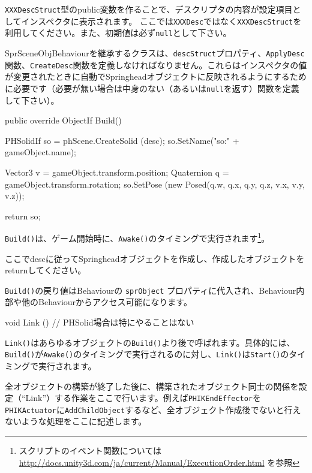 \texttt{XXXDescStruct}\KLUDGE 型のpublic\KLUDGE 変数を作ることで、デスクリプタの内容が設定項目としてインスペクタに表示されます。
\KLUDGE ここでは\texttt{XXXDesc}\KLUDGE ではなく\texttt{XXXDescStruct}\KLUDGE を利用してください。また、初期値は必ず\texttt{null}\KLUDGE として下さい。

SprSceneObjBehaviour\KLUDGE を継承するクラスは、\texttt{descStruct}\KLUDGE プロパティ、\texttt{ApplyDesc}\KLUDGE 関数、\texttt{CreateDesc}\KLUDGE 関数を定義しなければなりません。これらはインスペクタの値が変更されたときに自動でSpringhead\KLUDGE オブジェクトに反映されるようにするために必要です（必要が無い場合は中身のない（あるいは\texttt{null}\KLUDGE を返す）関数を定義して下さい）。

\begin{sourcecode}
    public override ObjectIf Build() {
        PHSolidIf so = phScene.CreateSolid (desc);
        so.SetName("so:" + gameObject.name);

        Vector3 v = gameObject.transform.position;
        Quaternion q = gameObject.transform.rotation;
        so.SetPose (new Posed(q.w, q.x, q.y, q.z, v.x, v.y, v.z));

        return so;
    }
\end{sourcecode}

\texttt{Build()}\KLUDGE は、ゲーム開始時に、\texttt{Awake()}\KLUDGE のタイミングで実行されます\footnote{\KLUDGE スクリプトのイベント関数については \url{http://docs.unity3d.com/ja/current/Manual/ExecutionOrder.html} \KLUDGE を参照}\KLUDGE 。

\KLUDGE ここでdesc\KLUDGE に従ってSpringhead\KLUDGE オブジェクトを作成し、作成したオブジェクトをreturn\KLUDGE してください。

\texttt{Build()}\KLUDGE の戻り値はBehaviour\KLUDGE の \texttt{sprObject} \KLUDGE プロパティに代入され、Behaviour\KLUDGE 内部や他のBehaviour\KLUDGE からアクセス可能になります。


\begin{sourcecode}
    void Link () {
        // PHSolid場合は特にやることはない
    }
\end{sourcecode}

\texttt{Link()}\KLUDGE はあらゆるオブジェクトの\texttt{Build()}\KLUDGE より後で呼ばれます。具体的には、\texttt{Build()}\KLUDGE が\texttt{Awake()}\KLUDGE のタイミングで実行されるのに対し、\texttt{Link()}\KLUDGE は\texttt{Start()}\KLUDGE のタイミングで実行されます。

\KLUDGE 全オブジェクトの構築が終了した後に、構築されたオブジェクト同士の関係を設定（``Link''\KLUDGE ）する作業をここで行います。例えば\texttt{PHIKEndEffector}\KLUDGE を\texttt{PHIKActuator}\KLUDGE に\texttt{AddChildObject}\KLUDGE するなど、全オブジェクト作成後でないと行えないような処理をここに記述します。

